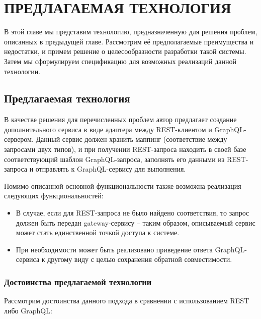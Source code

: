 

\chapter{ПРЕДЛАГАЕМАЯ ТЕХНОЛОГИЯ} \label{ch:ch2}

В этой главе мы представим технологию, предназначенную для решения проблем, описанных в предыдущей главе.
Рассмотрим её предполагаемые преимущества и недостатки, и примем решение о целесообразности разработки такой системы.
Затем мы сформулируем спецификацию для возможных реализаций данной технологии.


\section{Предлагаемая технология}\label{sec:proposed-technology}

В качестве решения для перечисленных проблем автор предлагает создание дополнительного сервиса в виде адаптера между REST-клиентом и GraphQL-сервером.
Данный сервис должен хранить маппинг (соответствие между запросами двух типов), и при получении REST-запроса находить в своей базе соответствующий шаблон GraphQL-запроса, заполнять его данными из REST-запроса и отправлять к GraphQL-сервису для выполнения.

Помимо описанной основной функциональности также возможна реализация следующих функциональностей:

\begin{itemize}
    \item В случае, если для REST-запроса не было найдено соответствия, то запрос должен быть передан gateway-сервису – таким образом, описываемый сервис может стать единственной точкой доступа к системе.
    \item При необходимости может быть реализовано приведение ответа GraphQL-сервиса к другому виду с целью сохранения обратной совместимости.
\end{itemize}

\subsection{Достоинства предлагаемой технологии}\label{subsec:proposed-technology-advantages}

Рассмотрим достоинства данного подхода в сравнении с использованием REST либо GraphQL:


